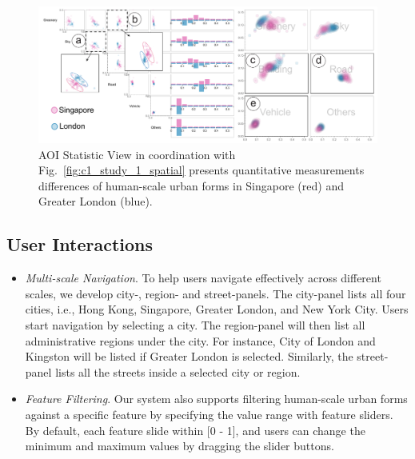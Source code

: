 \begin{figure}[t]
	\centering
	\includegraphics[width=\columnwidth]{figure/streetvizor/fig8_study_1/study_1_statistic}
	\vspace{-7mm}
	\caption{AOI Statistic View in coordination with Fig.~\ref{fig:c1_study_1_spatial} presents quantitative measurements differences of human-scale urban forms in Singapore (red) and Greater London (blue).}
	\label{fig:c1_study_1_statistic}
	\vspace{-5mm}
\end{figure}


\subsection{User Interactions}
\label{ssec:c1_user_interaction}


\begin{itemize}

\vspace*{-1mm}
\item
\textit{Multi-scale Navigation}.
To help users navigate effectively across different scales, we develop city-, region- and street-panels.
The city-panel lists all four cities, i.e., Hong Kong, Singapore, Greater London, and New York City.
Users start navigation by selecting a city. 
The region-panel will then list all administrative regions under the city.
For instance, City of London and Kingston will be listed if Greater London is selected.
Similarly, the street-panel lists all the streets inside a selected city or region.

\vspace*{-1mm}
\item
\textit{Feature Filtering}.
Our system also supports filtering human-scale urban forms against a specific feature by specifying the value range with feature sliders. 
By default, each feature slide within [0 - 1], and users can change the minimum and maximum values by dragging the slider buttons.

\end{itemize}

